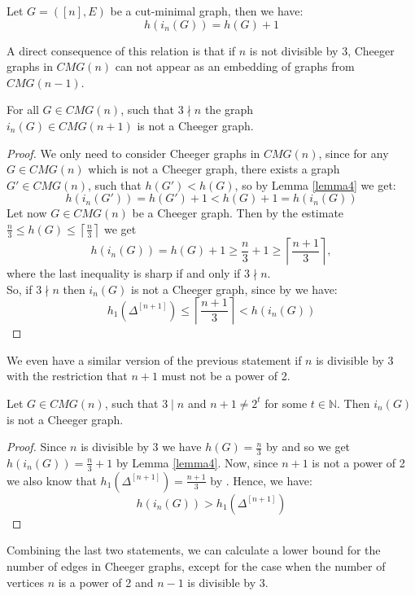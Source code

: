 \begin{lem}\label{lemma4}
Let \(G=([n],E)\) be a cut-minimal graph, then we have:
\[
h(i_n(G))=h(G)+1
\]
\end{lem}

A direct consequence of this relation is that if \(n\) is not divisible by 3, Cheeger graphs in \(CMG(n)\) can not appear as an embedding of graphs from \(CMG(n-1)\).

\begin{prop}\label{proposition4}
For all \(G\in CMG(n)\), such that \(3\nmid n\) the graph\\
\(i_n(G)\in CMG(n+1)\) is not a Cheeger graph.
\begin{proof}
We only need to consider Cheeger graphs in \(CMG(n)\), since for any\\
\(G\in CMG(n)\) which is not a Cheeger graph, there exists a graph \(G'\in CMG(n)\), such that \(h(G')<h(G)\), so by Lemma \ref{lemma4} we get:
\[
h(i_n(G'))=h(G')+1<h(G)+1=h(i_n(G))
\]
Let now \(G\in CMG(n)\) be a Cheeger graph. Then by the estimate \(\frac{n}{3}\leq h(G)\leq\left\lceil\frac{n}{3}\right\rceil\) we get
\[
h(i_n(G))=h(G)+1\geq\frac{n}{3}+1\geq\left\lceil\frac{n+1}{3}\right\rceil,
\]
where the last inequality is sharp if and only if \(3\nmid n\).\\
So, if \(3\nmid n\) then \(i_n(G)\) is not a Cheeger graph, since by \cite{1} we have:
\[
h_1(\Delta^{[n+1]})\leq\left\lceil\frac{n+1}{3}\right\rceil<h(i_n(G))
\]
\end{proof}
\end{prop}

We even have a similar version of the previous statement if \(n\) is divisible by 3 with the restriction that \(n+1\) must not be a power of 2.

\begin{prop}\label{proposition5}
Let \(G\in CMG(n)\), such that \(3\mid n\) and \(n+1\neq2^t\) for some \(t\in\mathbb{N}\). Then \(i_n(G)\) is not a Cheeger graph.
\begin{proof}
Since \(n\) is divisible by 3 we have \(h(G)=\frac{n}{3}\) by \cite{1} and so we get\\
\(h(i_n(G))=\frac{n}{3}+1\) by Lemma \ref{lemma4}. Now, since \(n+1\) is not a power of 2 we also know that \(h_1(\Delta^{[n+1]})=\frac{n+1}{3}\) by \cite{1}. Hence, we have:
\[
h(i_n(G))>h_1(\Delta^{[n+1]})
\]
\end{proof}
\end{prop}

Combining the last two statements, we can calculate a lower bound for the number of edges in Cheeger graphs, except for the case when the number of vertices \(n\) is a power of 2 and \(n-1\) is divisible by 3.

